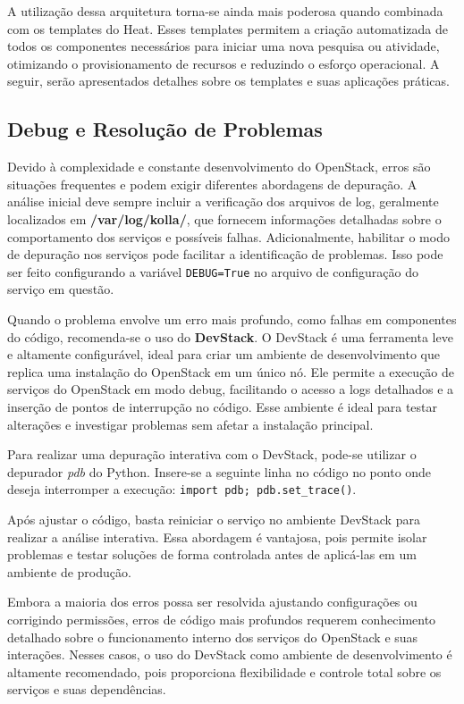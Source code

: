A utilização dessa arquitetura torna-se ainda mais poderosa quando combinada com os templates do Heat. Esses templates permitem a criação automatizada de todos os componentes necessários para iniciar uma nova pesquisa ou atividade, otimizando o provisionamento de recursos e reduzindo o esforço operacional. A seguir, serão apresentados detalhes sobre os templates e suas aplicações práticas.



\subsection{Debug e Resolução de Problemas}
Devido à complexidade e constante desenvolvimento do OpenStack, erros são situações frequentes e podem exigir diferentes abordagens de depuração. A análise inicial deve sempre incluir a verificação dos arquivos de log, geralmente localizados em \textbf{/var/log/kolla/}, que fornecem informações detalhadas sobre o comportamento dos serviços e possíveis falhas. Adicionalmente, habilitar o modo de depuração nos serviços pode facilitar a identificação de problemas. Isso pode ser feito configurando a variável \texttt{DEBUG=True} no arquivo de configuração do serviço em questão.

Quando o problema envolve um erro mais profundo, como falhas em componentes do código, recomenda-se o uso do \textbf{DevStack}. O DevStack é uma ferramenta leve e altamente configurável, ideal para criar um ambiente de desenvolvimento que replica uma instalação do OpenStack em um único nó. Ele permite a execução de serviços do OpenStack em modo debug, facilitando o acesso a logs detalhados e a inserção de pontos de interrupção no código. Esse ambiente é ideal para testar alterações e investigar problemas sem afetar a instalação principal.

Para realizar uma depuração interativa com o DevStack, pode-se utilizar o depurador \textit{pdb} do Python. Insere-se a seguinte linha no código no ponto onde deseja interromper a execução: \texttt{import pdb; pdb.set\_trace()}.

Após ajustar o código, basta reiniciar o serviço no ambiente DevStack para realizar a análise interativa. Essa abordagem é vantajosa, pois permite isolar problemas e testar soluções de forma controlada antes de aplicá-las em um ambiente de produção.

Embora a maioria dos erros possa ser resolvida ajustando configurações ou corrigindo permissões, erros de código mais profundos requerem conhecimento detalhado sobre o funcionamento interno dos serviços do OpenStack e suas interações. Nesses casos, o uso do DevStack como ambiente de desenvolvimento é altamente recomendado, pois proporciona flexibilidade e controle total sobre os serviços e suas dependências.


